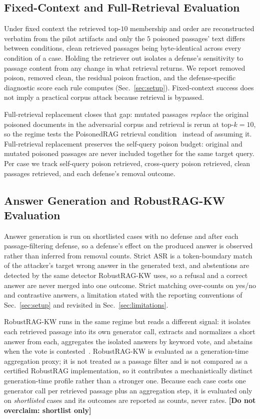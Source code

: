 \documentclass[conference]{IEEEtran}
\newcommand{\NOOVERCLAIM}[1]{\textbf{[Do not overclaim: #1]}}
\newcommand{\Npoison}{5}         %
\newcommand{\Ktop}{10}           %
\begin{document}
\subsection{Fixed-Context and Full-Retrieval Evaluation}
\label{subsec:fixedctx}
\label{subsec:fullret}
Under fixed context the retrieved top-$\Ktop$ membership and order are
reconstructed verbatim from the pilot artifacts and only the $\Npoison$ poisoned
passages' text differs between conditions, clean retrieved passages being
byte-identical across every condition of a case. Holding the retriever out
isolates a defense's sensitivity to passage content from any change in what
retrieval returns. We report removed poison, removed clean, the residual poison
fraction, and the defense-specific diagnostic score each rule computes
(Sec.~\ref{sec:setup}). Fixed-context success does not imply a practical corpus
attack because retrieval is bypassed.

Full-retrieval replacement closes that gap: mutated passages \emph{replace} the
original poisoned documents in the adversarial corpus and retrieval is rerun at
top-$k=\Ktop$, so the regime tests the PoisonedRAG retrieval
condition~\cite{zou2025poisonedrag} instead of assuming it. Full-retrieval
replacement preserves the self-query poison budget: original and mutated poisoned
passages are never included together for the same target query. Per case we track self-query poison retrieved, cross-query poison
retrieved, clean passages retrieved, and each defense's removal outcome.

\subsection{Answer Generation and RobustRAG-KW Evaluation}
\label{subsec:answergen}
Answer generation is run on shortlisted cases with no defense and after each
passage-filtering defense, so a defense's effect on the produced answer is
observed rather than inferred from removal counts. Strict ASR is a token-boundary
match of the attacker's target wrong answer in the generated text, and
abstentions are detected by the same detector RobustRAG-KW uses, so a refusal and
a correct answer are never merged into one outcome. Strict matching over-counts
on yes/no and contrastive answers, a limitation stated with the reporting
conventions of Sec.~\ref{sec:setup} and revisited in Sec.~\ref{sec:limitations}.

RobustRAG-KW runs in the same regime but reads a different signal: it isolates
each retrieved passage into its own generator call, extracts and normalizes a
short answer from each, aggregates the isolated answers by keyword vote, and
abstains when the vote is contested~\cite{xiang2024robustrag}. RobustRAG-KW is
evaluated as a generation-time aggregation proxy; it is not treated as a passage
filter and is not compared as a certified RobustRAG implementation, so it
contributes a mechanistically distinct generation-time profile rather than a
stronger one. Because each case costs one generator call per retrieved passage
plus an aggregation step, it is evaluated only on \emph{shortlisted} cases and
its outcomes are reported as counts, never rates. \NOOVERCLAIM{shortlist only}
\end{document}
